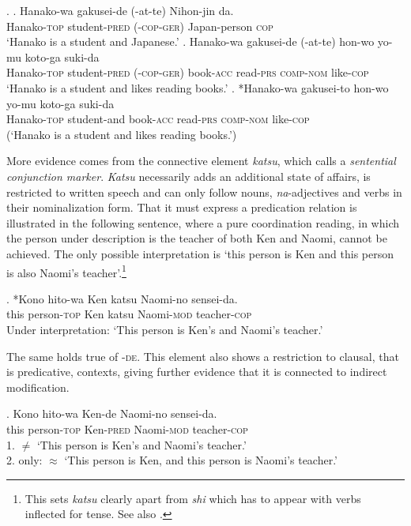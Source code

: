 \ex. \ag. Hanako-wa gakusei-de (-at-te) Nihon-jin da.\\
Hanako-\textsc{top} student-\textsc{pred} (-\textsc{cop}-\textsc{ger}) Japan-person \textsc{cop}\\
`Hanako is a student and Japanese.’
\bg. Hanako-wa gakusei-de (-at-te) hon-wo yo-mu koto-ga suki-da\\
Hanako-\textsc{top} student-\textsc{pred} (-\textsc{cop}-\textsc{ger}) book-\textsc{acc} read-\textsc{prs} \textsc{comp-nom} like-\textsc{cop}\\
`Hanako is a student and likes reading books.’
\cg. *Hanako-wa gakusei-to hon-wo yo-mu koto-ga suki-da\\
Hanako-\textsc{top} student-and book-\textsc{acc} read-\textsc{prs} \textsc{comp-nom} like-\textsc{cop}\\
(`Hanako is a student and likes reading books.’)

\largerpage
More evidence comes from the connective element \textit{katsu}, which \citet[364]{hiraiwa:2012:mechanism} calls a \textit{sentential conjunction marker}. \textit{Katsu} necessarily adds an additional state of affairs, is restricted to written speech and can only follow nouns, \textit{na}-adjectives and verbs in their nominalization form. That it must express a predication relation is illustrated in the following sentence, where a pure coordination reading, in which the person under description is the teacher of both Ken and Naomi, cannot be achieved. The only possible interpretation is `this person is Ken and this person is also Naomi's teacher’.\footnote{This sets \textit{katsu} clearly apart from \textit{shi} which has to appear with verbs inflected for tense. See also \citet{fenger:2020:words}.}

\newpage
\exg. *Kono hito-wa Ken katsu Naomi-no sensei-da.\\
this person-\textsc{top} Ken katsu Naomi-\textsc{mod} teacher-\textsc{cop}\\
Under interpretation: `This person is Ken's and Naomi's teacher.’

The same holds true of -\textsc{de}. This element also shows a restriction to clausal, that is predicative, contexts, giving further evidence that it is connected to indirect modification.

\exg. Kono hito-wa Ken-de Naomi-no sensei-da.\\
this person-\textsc{top} Ken-\textsc{pred} Naomi-\textsc{mod} teacher-\textsc{cop}\\
1. $\neq$ `This person is Ken's and Naomi's teacher.’\\
2. only: $\approx$ `This person is Ken, and this person is Naomi’s teacher.’

